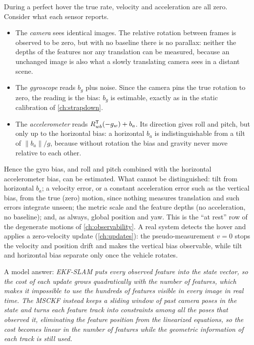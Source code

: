 \begin{solutions}
  \item During a perfect hover the true rate, velocity and acceleration are all zero. Consider what each sensor reports.
        \begin{itemize}[leftmargin=1.2em]
          \item The \emph{camera} sees identical images. The relative rotation between frames is observed to be zero, but
                with no baseline there is no parallax: neither the depths of the features nor any translation can be
                measured, because an unchanged image is also what a slowly translating camera sees in a distant scene.
          \item The \emph{gyroscope} reads $b_g$ plus noise. Since the camera pins the true rotation to zero, the reading is
                the bias: $b_g$ is estimable, exactly as in the static calibration of \cref{ch:strapdown}.
          \item The \emph{accelerometer} reads $R_{wb}^{\mathsf{T}}(-g_w) + b_a$. Its direction gives roll and pitch, but only up to the
                horizontal bias: a horizontal $b_a$ is indistinguishable from a tilt of $\|b_a\|/g$, because without
                rotation the bias and gravity never move relative to each other.
        \end{itemize}
        Hence the gyro bias, and roll and pitch combined with the horizontal accelerometer bias, can be estimated. What
        cannot be distinguished: tilt from horizontal $b_a$; a velocity error, or a constant acceleration error such as the
        vertical bias, from the true (zero) motion, since nothing measures translation and such errors integrate unseen;
        the metric scale and the feature depths (no acceleration, no baseline); and, as always, global position and yaw.
        This is the ``at rest'' row of the degenerate motions of \cref{ch:observability}. A real system detects the hover and
        applies a zero-velocity update (\cref{ch:updates}): the pseudo-measurement $v = 0$ stops the velocity and position
        drift and makes the vertical bias observable, while tilt and horizontal bias separate only once the vehicle
        rotates.

  \item A model answer: \emph{EKF-SLAM puts every observed feature into the state vector, so the cost of each update grows
        quadratically with the number of features, which makes it impossible to use the hundreds of features visible in
        every image in real time. The MSCKF instead keeps a sliding window of past camera poses in the state and turns each
        feature track into constraints among all the poses that observed it, eliminating the feature position from the
        linearized equations, so the cost becomes linear in the number of features while the geometric information of
        each track is still used.}
\end{solutions}
